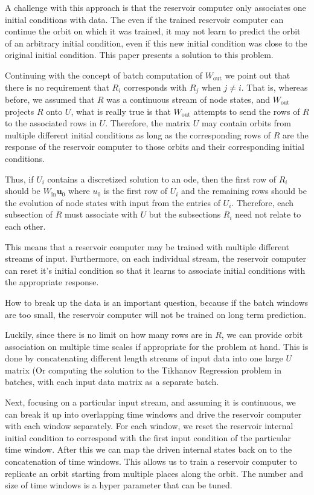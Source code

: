 \documentclass{article}
\begin{document}
A challenge with this approach is that the reservoir computer only associates one initial conditions with data. The even if the trained reservoir computer can continue the orbit on which it was trained, it may not learn to predict the orbit of an arbitrary initial condition, even if this new initial condition was close to the original initial condition. This paper presents a solution to this problem.

Continuing with the concept of batch computation of $W_\text{out}$ we point out that there is no requirement that $R_i$ corresponds with $R_j$ when $j \neq i$. That is, whereas before, we assumed that $R$ was a continuous stream of node states, and $W_\text{out}$ projects $R$ onto $U$, what is really true is that $W_\text{out}$ attempts to send the rows of $R$ to the associated rows in $U$. Therefore, the matrix $U$ may contain orbits from multiple different initial conditions as long as the corresponding rows of $R$ are the response of the reservoir computer to those orbits and their corresponding initial conditions.

Thus, if $U_i$ contains a discretized solution to an ode, then the first row of $R_i$ should be $W_\text{in} \mathbf{u}_0$ where $u_0$ is the first row of $U_i$ and the remaining rows should be the evolution of node states with input from the entries of $U_i$. Therefore, each subsection of $R$ must associate with $U$ but the subsections $R_i$ need not relate to each other.

This means that a reservoir computer may be trained with multiple different streams of input. Furthermore, on each individual stream, the reservoir computer can reset it's initial condition so that it learns to associate initial conditions with the appropriate response.

How to break up the data is an important question, because if the batch windows are too small, the reservoir computer will not be trained on long term prediction.

Luckily, since there is no limit on how many rows are in $R$, we can provide orbit association on multiple time scales if appropriate for the problem at hand. This is done by concatenating different length streams of input data into one large $U$ matrix (Or computing the solution to the Tikhanov Regression problem in batches, with each input data matrix as a separate batch.

Next, focusing on a particular input stream, and assuming it is continuous, we can break it up into overlapping time windows and drive the reservoir computer with each window separately. For each window, we reset the reservoir internal initial condition to correspond with the first input condition of the particular time window.  After this we can map the driven internal states back on to the concatenation of time windows. This allows us to train a reservoir computer to replicate an orbit starting from multiple places along the orbit. The number and size of time windows is a hyper parameter that can be tuned.
\end{document}
